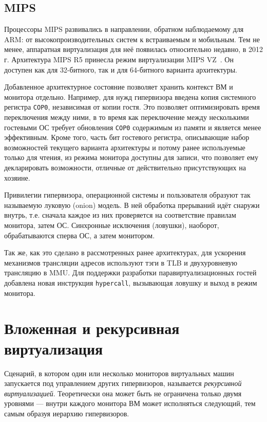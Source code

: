 \subsection{MIPS}

Процессоры MIPS развивались в направлении, обратном наблюдаемому для ARM: от высокопроизводительных систем к встраиваемым и мобильным. Тем не менее, аппаратная виртуализация для неё появилась относительно недавно, в 2012 г. Архитектура MIPS R5 принесла режим виртуализации MIPS VZ~\cite{mips-vz}. Он доступен как для 32-битного, так и для 64-битного варианта архитектуры.

Добавленное архитектурное состояние позволяет хранить контекст ВМ и монитора отдельно. Например, для нужд гипервизора введена копия системного регистра \texttt{COP0}, независимая от копии гостя. Это позволяет оптимизировать время переключения между ними, в то время как переключение между несколькими гостевыми ОС требует обновления \texttt{COP0} содержимым из памяти и является менее эффективным. Кроме того, часть бит гостевого регистра, описывающие набор возможностей текущего варианта архитектуры и потому ранее используемые только для чтения, из режима монитора доступны для записи, что позволяет ему декларировать возможности, отличные от действительно присутствующих на хозяине.

Привилегии гипервизора, операционной системы и пользователя образуют так называемую луковую (\abbr onion) модель. В ней обработка прерываний идёт снаружи внутрь, т.е. сначала каждое из них проверяется на соответствие правилам монитора, затем ОС. Синхронные исключения (ловушки), наоборот, обрабатываются сперва ОС, а затем монитором.

Так же, как это сделано в рассмотренных ранее архитектурах, для ускорения механизмов трансляции адресов используют тэги в TLB и двухуровневую трансляцию в MMU. Для поддержки разработки паравиртуализационных гостей добавлена новая инструкция \texttt{hypercall}, вызывающая ловушку и выход в режим монитора.

\section{Вложенная и рекурсивная виртуализация}


Сценарий, в котором один или несколько мониторов виртуальных машин запускается под управлением других гипервизоров, называется \textit{рекурсивной виртуализацией}. Теоретически она может быть не ограничена только двумя уровнями — внутри каждого монитора ВМ может исполняться следующий, тем самым образуя иерархию гипервизоров.

